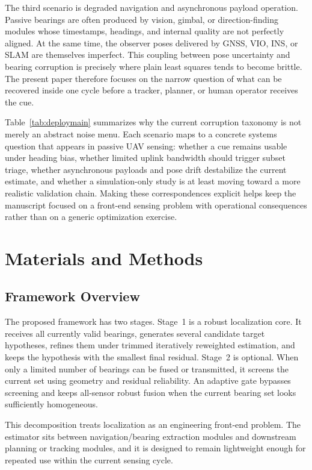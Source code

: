 \documentclass[drones,article,submit,pdftex,moreauthors]{Definitions/mdpi}
\begin{document}
The third scenario is degraded navigation and asynchronous payload operation. Passive bearings are often produced by vision, gimbal, or direction-finding modules whose timestamps, headings, and internal quality are not perfectly aligned. At the same time, the observer poses delivered by GNSS, VIO, INS, or SLAM are themselves imperfect. This coupling between pose uncertainty and bearing corruption is precisely where plain least squares tends to become brittle. The present paper therefore focuses on the narrow question of what can be recovered inside one cycle before a tracker, planner, or human operator receives the cue.



Table~\ref{tab:deploymain} summarizes why the current corruption taxonomy is not merely an abstract noise menu. Each scenario maps to a concrete systems question that appears in passive UAV sensing: whether a cue remains usable under heading bias, whether limited uplink bandwidth should trigger subset triage, whether asynchronous payloads and pose drift destabilize the current estimate, and whether a simulation-only study is at least moving toward a more realistic validation chain. Making these correspondences explicit helps keep the manuscript focused on a front-end sensing problem with operational consequences rather than on a generic optimization exercise.

\section{Materials and Methods}

\subsection{Framework Overview}

The proposed framework has two stages. Stage~1 is a robust localization core. It receives all currently valid bearings, generates several candidate target hypotheses, refines them under trimmed iteratively reweighted estimation, and keeps the hypothesis with the smallest final residual. Stage~2 is optional. When only a limited number of bearings can be fused or transmitted, it screens the current set using geometry and residual reliability. An adaptive gate bypasses screening and keeps all-sensor robust fusion when the current bearing set looks sufficiently homogeneous.

This decomposition treats localization as an engineering front-end problem. The estimator sits between navigation/bearing extraction modules and downstream planning or tracking modules, and it is designed to remain lightweight enough for repeated use within the current sensing cycle.
\end{document}
